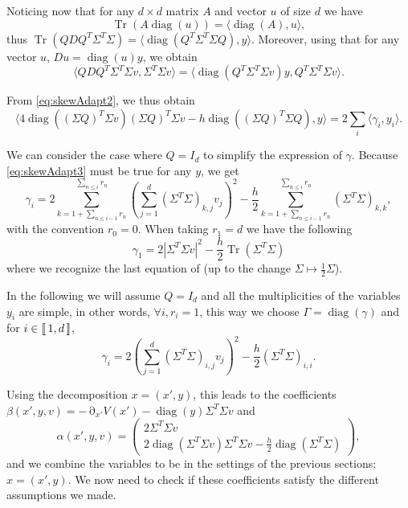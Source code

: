 \documentclass[12pt]{amsart}
\newcommand{\diag}{\operatorname{diag}}
\newcommand{\Tr}{{\operatorname{Tr}}}
\def\<{\langle}
\def\>{\rangle}
\numberwithin{equation}{section}
\numberwithin{figure}{section}
\DeclareMathOperator{\p}{\partial}
\newcommand{\lb}{\operatorname{[\negthinspace [}}
\newcommand{\rb}{\operatorname{]\negthinspace ]}}
\begin{document}
Noticing now that for any $d\times d$ matrix $A$ and vector $u$ of size $d$ we have
\begin{equation*}
\Tr(A\diag(u)) = \<\diag(A),u\>,
\end{equation*}
thus $\Tr(QDQ^T\Sigma^T\Sigma) = \<\diag(Q^T\Sigma^T\Sigma Q),y\>$. Moreover, using that for any vector $u$, $Du = \diag(u) y$, we obtain
\begin{equation*}
\<QDQ^T\Sigma^T\Sigma v,\Sigma^T\Sigma v\> = \<\diag(Q^T\Sigma^T\Sigma v)y,Q^T\Sigma^T\Sigma v\>.
\end{equation*}

From \eqref{eq:skewAdapt2}, we thus obtain
\begin{equation}\label{eq:skewAdapt3}
\<4\diag((\Sigma Q)^T\Sigma v)(\Sigma Q)^T\Sigma v - h\diag((\Sigma Q)^T\Sigma Q), y\> = 2\sum_i\<\gamma_i, y_i\>.
\end{equation}

We can consider the case where $Q = I_d$ to simplify the expression of $\gamma$. Because \eqref{eq:skewAdapt3} must be true for any $y$, we get
\begin{equation*}
\gamma_i = 2\sum_{k = 1+\sum_{n\leq i-1}r_{n}}^{\sum_{n\leq i}r_{n}}(\sum_{j=1}^d(\Sigma^T\Sigma)_{k,j}v_j)^2 - \frac h2\sum_{k = 1+\sum_{n\leq i-1}r_{n}}^{\sum_{n\leq i}r_{n}}(\Sigma^T\Sigma)_{k,k},
\end{equation*}
with the convention $r_0 = 0$. When taking $r_1=d$ we have the following
\begin{equation*}
\gamma_1 = 2|\Sigma^T\Sigma v|^2 - \frac h2\Tr(\Sigma^T\Sigma)
\end{equation*}
where we recognize the last equation of \cite[(1.2)]{LeSaSt20} (up to the change $\Sigma\mapsto\frac12\Sigma$).

In the following we will assume $Q = I_d$ and all the multiplicities of the variables $y_i$ are simple, in other words, $\forall i, r_i = 1$, this way we choose $\Gamma = \diag(\gamma)$ and for $i\in\lb1,d\rb$,
\begin{equation*}
\gamma_i = 2(\sum_{j=1}^d(\Sigma^T\Sigma)_{i,j}v_j)^2 - \frac h2(\Sigma^T\Sigma)_{i,i}.
\end{equation*}

Using the decomposition $x = (x',y)$, this leads to the coefficients $\beta(x',y,v) = -\p_{x'}V(x') - \diag(y)\Sigma^T\Sigma v$ and
\begin{equation*}
\alpha(x',y,v) = \begin{pmatrix}2\Sigma^T\Sigma v\\2\diag(\Sigma^T\Sigma v)\Sigma^T\Sigma v - \frac h2\diag(\Sigma^T\Sigma)\end{pmatrix},
\end{equation*}
and we combine the variables to be in the settings of the previous sections: $x = (x',y)$. We now need to check if these coefficients satisfy the different assumptions we made.
\end{document}

